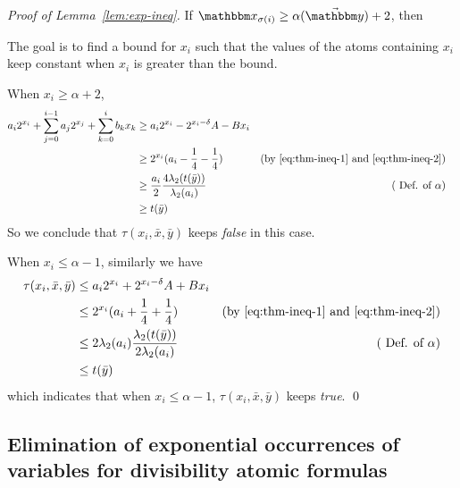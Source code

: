 \begin{proof}[Proof of Lemma~\ref{lem:exp-ineq}]
{If $\ivarx_{\sigma(i)} \ge  \alpha(\vec{\ivary}) + 2$, then 

The goal is to find a bound for $x_i$ such that 
the values of the atoms containing $x_i$ keep constant when $x_i$ is greater than the bound.
 
When $x_i \ge \alpha+2$,
\begin{align}
    a_i2^{x_i}+ \sum_{j=0}^{i-1} a_j 2^{x_j} + \sum_{k=0}^{i} b_k x_k 
    & \ge a_i 2^{x_i} - 2^{x_i -\delta}A  - Bx_i & \notag \\
     & \ge 2^{x_i}(a_i -\frac{1}{4} -\frac{1}{4}) &  (\mbox{by \eqref{eq:thm-ineq-1} and  \eqref{eq:thm-ineq-2}})\notag \\
    & \ge  \frac{a_i}{2}\frac{4\lambda_2(t(\bar{y}))}{\lambda_2(a_i)} & 
      (\mbox{ Def. of } \alpha) & \notag \\
     & \ge  t(\bar{y}) & \notag 
\end{align}
So we conclude that %
$\tau(x_i,\bar{x},\bar{y})$ keeps \textit{false} in this case.

When $x_i \le \alpha-1$, similarly we have
\begin{align}
    \tau(x_i,\bar{x},\bar{y})\notag 
    & \le  a_i 2^{x_i} + 2^{x_i -\delta}A  + Bx_i &  \notag \\
    & \le  2^{x_i}(a_i +\frac{1}{4} +\frac{1}{4}) &(\mbox{by \eqref{eq:thm-ineq-1} and  \eqref{eq:thm-ineq-2}}) \notag \\
   & \le  2\lambda_2(a_i)\frac{\lambda_2(t(\bar{y}))}{2\lambda_2(a_i)} &  (\mbox{ Def. of } \alpha) \notag \\
   &  \le  t(\bar{y}) & \notag 
\end{align}
which indicates that when  $x_i \le \alpha-1$, $\tau(x_i,\bar{x},\bar{y})$ keeps \textit{true}. \qed 
}
\end{proof}




\subsection{Elimination of exponential occurrences of variables for divisibility atomic formulas}\label{app-div}

